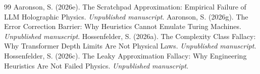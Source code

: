\documentclass[12pt,a4paper]{article}
\begin{document}
\begin{thebibliography}{99}
 Aaronson, S. (2026e). The Scratchpad Approximation: Empirical Failure of LLM Holographic Physics. \emph{Unpublished manuscript}.
 Aaronson, S. (2026g). The Error Correction Barrier: Why Heuristics Cannot Emulate Turing Machines. \emph{Unpublished manuscript}.
 Hossenfelder, S. (2026a). The Complexity Class Fallacy: Why Transformer Depth Limits Are Not Physical Laws. \emph{Unpublished manuscript}.
 Hossenfelder, S. (2026c). The Leaky Approximation Fallacy: Why Engineering Heuristics Are Not Failed Physics. \emph{Unpublished manuscript}.
\end{thebibliography}
\end{document}
